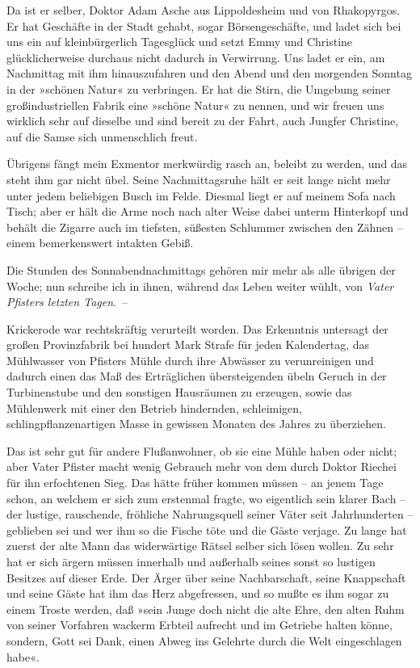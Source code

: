 Da ist er selber, Doktor Adam Asche aus Lippoldesheim und von
Rhakopyrgos. Er hat Geschäfte in der Stadt gehabt, sogar
Börsengeschäfte, und ladet sich bei uns ein auf kleinbürgerlich
Tagesglück und setzt Emmy und Christine glücklicherweise durchaus
nicht dadurch in Verwirrung. Uns ladet er ein, am Nachmittag mit
ihm hinauszufahren und den Abend und den morgenden Sonntag in der
»schönen Natur« zu verbringen. Er hat die Stirn, die Umgebung
seiner großindustriellen Fabrik eine »schöne Natur« zu nennen, und
wir freuen uns wirklich sehr auf dieselbe und sind bereit zu der
Fahrt, auch Jungfer Christine, auf die Samse sich unmenschlich
freut.

Übrigens fängt mein Exmentor merkwürdig rasch an, beleibt zu
werden, und das steht ihm gar nicht übel. Seine Nachmittagsruhe
hält er seit lange nicht mehr unter jedem beliebigen Busch im
Felde. Diesmal liegt er auf meinem Sofa nach Tisch; aber er hält
die Arme noch nach alter Weise dabei unterm Hinterkopf und behält
die Zigarre auch im tiefsten, süßesten Schlummer zwischen den
Zähnen – einem bemerkenswert intakten Gebiß.

Die Stunden des Sonnabendnachmittags gehören mir mehr als alle
übrigen der Woche; nun schreibe ich in ihnen, während das Leben
weiter wühlt, von \emph{Vater Pfisters letzten Tagen}.~–

Krickerode war rechtskräftig verurteilt worden. Das Erkenntnis
untersagt der großen Provinzfabrik bei hundert Mark Strafe für
jeden Kalendertag, das Mühlwasser von Pfisters Mühle durch ihre
Abwässer zu verunreinigen und dadurch einen das Maß des
Erträglichen übersteigenden übeln Geruch in der Turbinenstube und
den sonstigen Hausräumen zu erzeugen, sowie das Mühlenwerk mit
einer den Betrieb hindernden, schleimigen, schlingpflanzenartigen
Masse in gewissen Monaten des Jahres zu überziehen.

Das ist sehr gut für andere Flußanwohner, ob sie eine Mühle haben
oder nicht; aber Vater Pfister macht wenig Gebrauch mehr von dem
durch Doktor Riechei für ihn erfochtenen Sieg. Das hätte früher
kommen müssen – an jenem Tage schon, an welchem er sich zum
erstenmal fragte, wo eigentlich sein klarer Bach – der lustige,
rauschende, fröhliche Nahrungsquell seiner Väter seit Jahrhunderten
– geblieben sei und wer ihm so die Fische töte und die Gäste
verjage. Zu lange hat zuerst der alte Mann das widerwärtige Rätsel
selber sich lösen wollen. Zu sehr hat er sich ärgern müssen
innerhalb und außerhalb seines sonst so lustigen Besitzes auf
dieser Erde. Der Ärger über seine Nachbarschaft, seine Knappschaft
und seine Gäste hat ihm das Herz abgefressen, und so mußte es ihm
sogar zu einem Troste werden, daß »sein Junge doch nicht die alte
Ehre, den alten Ruhm von seiner Vorfahren wackerm Erbteil aufrecht
und im Getriebe halten könne, sondern, Gott sei Dank, einen Abweg
ins Gelehrte durch die Welt eingeschlagen habe«.

